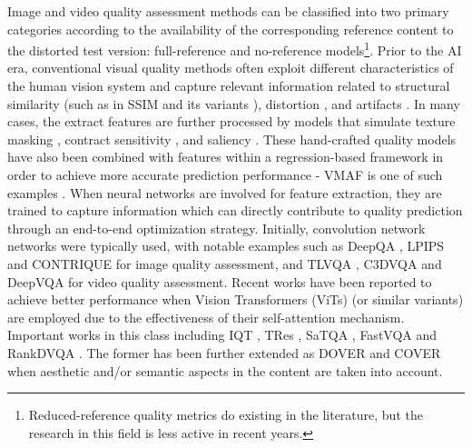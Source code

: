 \documentclass[11pt,a4paper]{article}
\begin{document}
Image and video quality assessment methods can be classified into two primary categories according to the availability of the corresponding reference content to the distorted test version: full-reference and no-reference models\footnote{Reduced-reference quality metrics do existing in the literature, but the research in this field is less active in recent years.}. Prior to the AI era, conventional visual quality methods often exploit different characteristics of the human vision system and capture relevant information related to structural similarity (such as in SSIM and its variants \cite{Bovik_SSIM,wang2003multiscale,rehman2015display}), distortion \cite{chandler2007vsnr,larson2010most,STMAD}, and artifacts \cite{ou2010perceptual,zhu2014no,zhang2015perception}. In many cases, the extract features are further processed by models that simulate texture masking \cite{helmholtz1896handbook}, contract sensitivity \cite{kelly1977visual}, and saliency \cite{itti2001computational}. These hand-crafted quality models have also been combined with features within a regression-based framework in order to achieve more accurate prediction performance - VMAF is one of such examples \cite{VMAFblog}. When neural networks are involved for feature extraction, they are trained to capture information which can directly contribute to quality prediction through an end-to-end optimization strategy. Initially, convolution network networks were typically used, with notable examples such as DeepQA \cite{kim2017deep}, LPIPS \cite{zhang2018unreasonable} and CONTRIQUE \cite{madhusudana2022image} for image quality assessment, and TLVQA \cite{korhonen2019two}, C3DVQA \cite{xu2020c3dvqa} and DeepVQA \cite{kim2018deep} for video quality assessment. Recent works have been reported to achieve better performance when Vision Transformers (ViTs) (or similar variants) are employed due to the effectiveness of their self-attention mechanism. Important works in this class including IQT \cite{cheon2021perceptual}, TRes \cite{golestaneh2022no}, SaTQA \cite{shi2024transformer}, FastVQA \cite{wu2022fast} and RankDVQA \cite{feng2024rankdvqa}. The former has been further extended as DOVER \cite{wu2023exploringvideo} and COVER \cite{he2024cover} when aesthetic and/or semantic aspects in the content are taken into account. 
\end{document}
